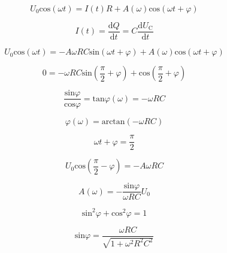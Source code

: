         \begin{equation}
            U_0 \text{cos}(\omega t) = I(t)R + A(\omega) \text{cos}(\omega t + \varphi)
        \end{equation}

        \begin{equation}
            I(t) = \frac{\text{d}Q}{\text{d}t} = C \frac{\text{d}U_\text{C}}{\text{d}t}
        \end{equation}

        \begin{equation}
            U_0 \text{cos}(\omega t) = -A\omega R C \text{sin}(\omega t + \varphi) + A(\omega) \text{cos}(\omega t + \varphi)
        \end{equation}

        \begin{equation}
            0 = -\omega R C \text{sin} \left( \frac{\pi}{2} + \varphi \right) + \text{cos} \left( \frac{\pi}{2} + \varphi \right)
        \end{equation}

        \begin{equation}
            \frac{\text{sin} \varphi}{\text{cos} \varphi} = \text{tan} \varphi (\omega) = -\omega RC 
        \end{equation}

        \begin{equation}
            \varphi (\omega) = \text{arctan} ( - \omega R C)
        \end{equation}

        \begin{equation}
            \omega t + \varphi = \frac{\pi}{2}
        \end{equation}

        \begin{equation}
            U_0 \text{cos}(\frac{\pi}{2} - \varphi) = -A \omega R C 
        \end{equation}

        \begin{equation}
            A(\omega) = - \frac{\text{sin} \varphi}{\omega R C} U_0
        \end{equation}

        \begin{equation}
            \text{sin}^2 \varphi + \text{cos}^2 \varphi = 1
        \end{equation}

        \begin{equation}
            \text{sin} \varphi = \frac{\omega R C}{ \sqrt{1 + \omega^2 R^2 C^2} }
        \end{equation}

